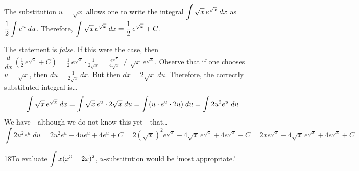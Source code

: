 \documentclass[11pt,letterpaper]{article}
\begin{document}
\newpage



 The substitution $u= \sqrt{x}$ allows one to write the integral $\displaystyle\int\sqrt{x} \, e^{\sqrt{x}}\;dx$ as $\displaystyle\frac{1}{2} \int e^u \;du$. Therefore, $\displaystyle\int \sqrt{x} \, e^{\sqrt{x}} \;dx= \frac{1}{2}\, e^{\sqrt{x}} + C$. \pspace

\sol The statement is \textit{false}. If this were the case, then $\dfrac{d}{dx} \,(\frac{1}{2}\, e^{\sqrt{x}} + C)= \frac{1}{2}\, e^{\sqrt{x}} \cdot \frac{1}{2 \sqrt{x}} = \frac{e^{\sqrt{x}}}{4 \sqrt{x}} \neq \sqrt{x} \, e^{\sqrt{x}}$. Observe that if one chooses $u= \sqrt{x}$, then $du= \frac{1}{2\sqrt{x}} \,dx$. But then $dx= 2 \sqrt{x} \;du$. Therefore, the correctly substituted integral is\dots
	\[
	\displaystyle\int\sqrt{x} \, e^{\sqrt{x}}\;dx= \int \sqrt{x} \, e^u \cdot 2 \sqrt{x} \; du= \int (u \cdot e^u \cdot 2u) \;du= \int 2u^2 e^u \;du
	\]
We have---although we do not know this yet---that\dots
	\[
	 \int 2u^2 e^u \;du= 2 u^2 e^u - 4 u e^u + 4e^u + C= 2 (\sqrt{x})^2 e^{\sqrt{x}} - 4 \sqrt{x}\, e^{\sqrt{x}} + 4e^{\sqrt{x}} + C= 2x e^{\sqrt{x}} - 4 \sqrt{x}\, e^{\sqrt{x}} + 4e^{\sqrt{x}} + C
	\] \pvspace{1.3cm}





18To evaluate $\displaystyle\int x(x^3 - 2x)^2$, $u$-substitution would be `most appropriate.'
\end{document}
